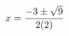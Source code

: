 \documentclass[preview]{standalone}
\begin{document}
\begin{align*}
\special{dvisvgm:raw <g id='unique000'>}x=\frac{-3\pm\sqrt{9}}{2(2)}\special{dvisvgm:raw </g>}
\end{align*}
\end{document}
